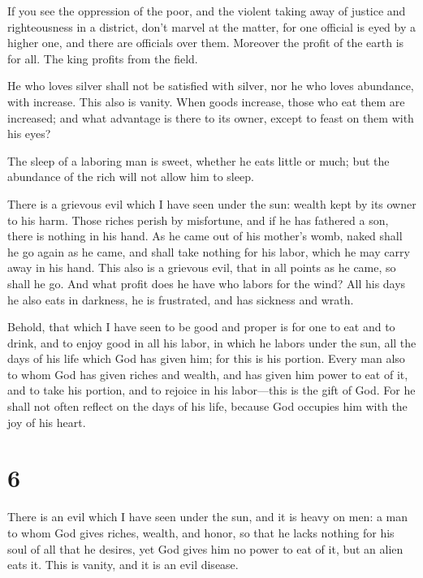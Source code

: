  If you see the oppression of the poor, and the violent
taking away of justice and righteousness in a district, don't marvel at
the matter, for one official is eyed by a higher one, and there are
officials over them.  Moreover the profit of the earth is
for all. The king profits from the field.

 He who loves silver shall not be satisfied with silver,
nor he who loves abundance, with increase. This also is vanity.
 When goods increase, those who eat them are increased; and
what advantage is there to its owner, except to feast on them with his
eyes?

 The sleep of a laboring man is sweet, whether he eats
little or much; but the abundance of the rich will not allow him to
sleep.

 There is a grievous evil which I have seen under the sun:
wealth kept by its owner to his harm.  Those riches perish
by misfortune, and if he has fathered a son, there is nothing in his
hand.  As he came out of his mother's womb, naked shall he
go again as he came, and shall take nothing for his labor, which he may
carry away in his hand.  This also is a grievous evil, that
in all points as he came, so shall he go. And what profit does he have
who labors for the wind?  All his days he also eats in
darkness, he is frustrated, and has sickness and wrath.

 Behold, that which I have seen to be good and proper is
for one to eat and to drink, and to enjoy good in all his labor, in
which he labors under the sun, all the days of his life which God has
given him; for this is his portion.  Every man also to whom
God has given riches and wealth, and has given him power to eat of it,
and to take his portion, and to rejoice in his labor---this is the gift
of God.  For he shall not often reflect on the days of his
life, because God occupies him with the joy of his heart.

\hypertarget{section-5}{%
\section{6}\label{section-5}}

 There is an evil which I have seen under the sun, and it is
heavy on men:  a man to whom God gives riches, wealth, and
honor, so that he lacks nothing for his soul of all that he desires, yet
God gives him no power to eat of it, but an alien eats it. This is
vanity, and it is an evil disease.


